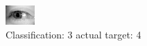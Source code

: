 \begin{figure}[h!]
\begin{center}
\includegraphics[width=0.60\columnwidth]{figures/ID3221_class_3_target_4.png}
\end{center}
\caption{ Classification: 3 actual target: 4}
\label{fig:ID3221_class_3_target_4}
\end{figure}
